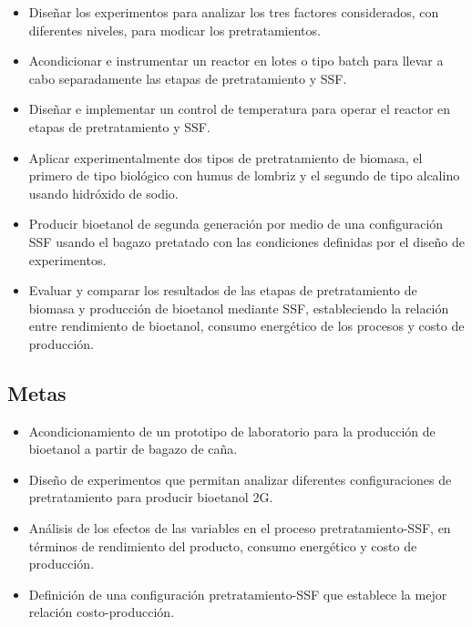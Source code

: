 \documentclass[12pt]{article}
\begin{document}
	\begin{itemize}
		\item Diseñar los experimentos para analizar los tres factores considerados, con diferentes niveles, para modicar los pretratamientos.
		\item Acondicionar e instrumentar un reactor en lotes o tipo batch para llevar a cabo separadamente las etapas de pretratamiento y SSF.
		\item Diseñar e implementar un control de temperatura para operar el reactor en etapas de pretratamiento y SSF.
		\item Aplicar experimentalmente dos tipos de pretratamiento de biomasa, el primero de tipo biológico con humus de lombriz y el segundo de tipo alcalino usando hidróxido de sodio.
		\item Producir bioetanol de segunda generación por medio de una configuración SSF usando el bagazo pretatado con las condiciones definidas por el diseño de experimentos.
		\item Evaluar y comparar los resultados de las etapas de pretratamiento de biomasa y producción de bioetanol mediante SSF, estableciendo la relación entre rendimiento de bioetanol, consumo energético de los procesos y costo de producción.		


	\end{itemize}
	
	\subsection{Metas}
	
	\begin{itemize}



		\item 
		Acondicionamiento de un prototipo de laboratorio para la producción de bioetanol a partir de bagazo de caña.
		
		\item 
		Diseño de experimentos que permitan analizar diferentes configuraciones de pretratamiento para producir bioetanol 2G. 
		
		
		\item 
		Análisis de los efectos de las variables en el proceso pretratamiento-SSF, en términos de rendimiento del producto, consumo energético y costo de producción.
		
	   \item Definición de una configuración pretratamiento-SSF que establece la mejor relación costo-producción.
		
	\end{itemize}
	\newpage
	
\end{document}
